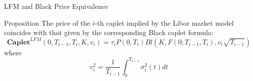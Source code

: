 \documentclass{beamer}
\begin{document}

\begin{frame}{LFM and Black Price Equivalence}
	\begin{block}{Proposition}
		The price of the $i$-th caplet implied by the Libor market model coincides with that given by the corresponding Black caplet formula:
		\begin{equation}
			\textbf{Caplet}^{LFM}(0, T_{i-1}, T_i, K, v_i)= \tau_i P(0, T_i) Bl(K, F(0; T_{i-1}, T_i), v_i\sqrt{T_{i-1}})
		\end{equation}
		where
		\begin{equation}
			v_i^2 = \frac{1}{T_{i-1}}\int_0^{T_{i-1}}\sigma_i^2(t)dt
			\label{eq:caplet_black_vol}
		\end{equation}
	\end{block}
\end{frame}
\end{document}
